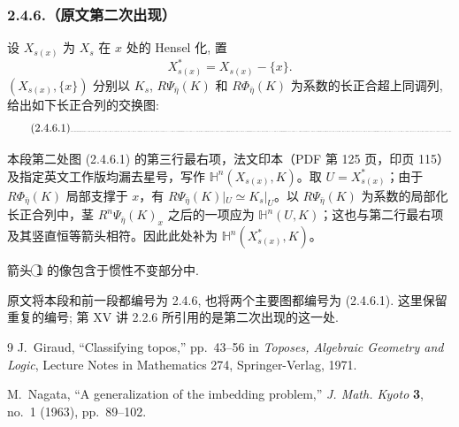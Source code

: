 \subsubsection*{2.4.6.（原文第二次出现）}
设 $X_{s(x)}$ 为 $X_s$ 在 $x$ 处的 Hensel 化, 置
\[
X^*_{s(x)}=X_{s(x)}-\{x\}.
\]
$(X_{s(x)},\{x\})$ 分别以 $K_s$, $R\Psi_{\bar\eta}(K)$ 和 $R\Phi_{\bar\eta}(K)$ 为系数的长正合超上同调列, 给出如下长正合列的交换图:
\begin{equation}\tag{2.4.6.1}
\resizebox{\textwidth}{!}{%
\begin{tikzcd}[ampersand replacement=\&, column sep=large, row sep=large]
{}
  \& 0 \arrow[r] \arrow[d]
  \& R^{n-1}\Phi_{\bar\eta}(K)_x \arrow[r] \arrow[d]
  \& R^{n-1}\Phi_{\bar\eta}(K)_x \arrow[r] \arrow[d]
  \& 0 \arrow[d]
  \& {} \\
{} \arrow[r]
  \& \mathbb H^{n-1}(X^*_{s(x)},K)
     \arrow[r, "j"] \arrow[d, equal]
  \& \mathbb H^n_{\{x\}}(X_s,K) \arrow[r] \arrow[d]
  \& \underline{H}^{n}(K)_x \arrow[r] \arrow[d]
  \& \mathbb H^n(X^*_{s(x)},K)
     \arrow[r] \arrow[d, equal]
  \& {} \\
{} \arrow[r]
  \& \mathbb H^{n-1}(X^*_{s(x)},K)
     \arrow[r, "j", "{\mbox{\textcircled{1}}}"'] \arrow[d]
  \& \mathbb H^n_{\{x\}}\bigl(X_s,R\Psi_{\bar\eta}(K)\bigr)
     \arrow[r] \arrow[d]
  \& R^n\Psi_{\bar\eta}(K)_x \arrow[r] \arrow[d]
  \& \mathbb H^n(X^*_{s(x)},K) \arrow[r] \arrow[d]
  \& {} \\
{}
  \& 0 \arrow[r]
  \& R^n\Phi_{\bar\eta}(K)_x \arrow[r, equal]
  \& R^n\Phi_{\bar\eta}(K)_x \arrow[r]
  \& 0
  \& {}
\end{tikzcd}}
\end{equation}
\begin{editorialnote}
本段第二处图 (2.4.6.1) 的第三行最右项，法文印本（PDF 第 125 页，印页 115）及指定英文工作版均漏去星号，写作 $\mathbb H^n(X_{s(x)},K)$。取 $U=X^*_{s(x)}$；由于 $R\Phi_{\bar\eta}(K)$ 局部支撑于 $x$，有 $R\Psi_{\bar\eta}(K)|_U\simeq K_s|_U$。以 $R\Psi_{\bar\eta}(K)$ 为系数的局部化长正合列中，茎 $R^n\Psi_{\bar\eta}(K)_x$ 之后的一项应为 $\mathbb H^n(U,K)$；这也与第二行最右项及其竖直恒等箭头相符。因此此处补为 $\mathbb H^n(X^*_{s(x)},K)$。
\end{editorialnote}
箭头 \textcircled{1} 的像包含于惯性不变部分中.

原文将本段和前一段都编号为 2.4.6, 也将两个主要图都编号为 (2.4.6.1). 这里保留重复的编号; 第 XV 讲 2.2.6 所引用的是第二次出现的这一处.

\renewcommand{\refname}{参考文献}
\begin{thebibliography}{9}
J.~Giraud, ``Classifying topos,'' pp.~43--56 in
\emph{Toposes, Algebraic Geometry and Logic},
Lecture Notes in Mathematics 274, Springer-Verlag, 1971.

M.~Nagata, ``A generalization of the imbedding problem,''
\emph{J. Math. Kyoto} \textbf{3}, no.~1 (1963), pp.~89--102.
\end{thebibliography}
